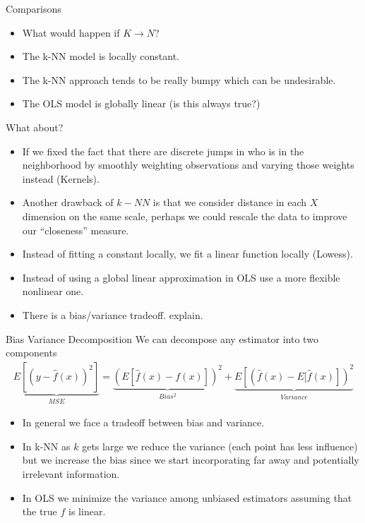 \begin{frame}{Comparisons}
  \begin{itemize}
  \item What would happen if $K \rightarrow N$?
  \item The k-NN model is locally constant.
  \item The k-NN approach tends to be really bumpy which can be undesirable.
  \item The OLS model is globally linear (is this always true?)
  \end{itemize}
  \end{frame}
  \begin{frame}{What about?}
  \begin{itemize}
  \item If we fixed the fact that there are discrete jumps in who is in the neighborhood by smoothly weighting observations and varying those weights instead (Kernels).
  \item Another drawback of $k-NN$ is that we consider distance in each $X$ dimension on the same scale, perhaps we could rescale the data to improve our ``closeness'' measure.
  \item Instead of fitting a constant locally, we fit a linear function locally (Lowess).
  \item Instead of using a global linear approximation in OLS use a more flexible nonlinear one.
  \item There is a bias/variance tradeoff. \alert{explain}.
  \end{itemize}
\end{frame}

\begin{frame}{Bias Variance Decomposition}
We can decompose any estimator into two components
\begin{eqnarray*}
\underbrace{E[(y- \hat{f}(x))^2]}_{MSE} =\underbrace{\left( E[\hat{f}(x) - f(x)] \right)^2}_{Bias^2}  +  \underbrace{E \left[ \left(\hat{f}(x) - E[\hat{f}(x) \right] \right)^2}_{Variance} 
\end{eqnarray*}
\begin{itemize}
\item In general we face a tradeoff between bias and variance.
\item In k-NN as $k$ gets large we reduce the variance (each point has less influence) but we increase the bias since we start incorporating far away and potentially irrelevant information.
\item In OLS we minimize the variance among unbiased estimators assuming that the true $f$ is linear.
\end{itemize}
\end{frame}

